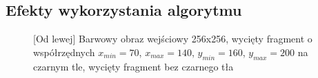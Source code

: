 \documentclass[a4paper,12pt, titlepage]{report}
\begin{document}
\subsection*{Efekty wykorzystania algorytmu}
\begin{figure}[h]
    \centering
    \caption{[Od lewej] Barwowy obraz wejściowy 256x256, wycięty fragment o współrzędnych \(x_{min}=70\), \(x_{max}=140\), \(y_{min}=160\), \(y_{max}=200\) na czarnym tle, wycięty fragment bez czarnego tła}%
    \label{fig:geo_after_grey1}%
\end{figure}
\FloatBarrier
\end{document}
